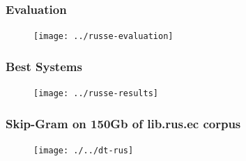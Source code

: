 \begin{frame}
\frametitle{ Evaluation }

\begin{figure}  
    \texttt{[image: ../russe-evaluation]}
\end{figure}

\end{frame}





\begin{frame}
\frametitle{ Best Systems }

\begin{figure}  
    \texttt{[image: ../russe-results]}
\end{figure}

\end{frame}


\begin{frame}
\frametitle{Skip-Gram on 150Gb of   lib.rus.ec corpus}
\begin{figure}
\centering
\texttt{[image: ./../dt-rus]}
\end{figure}
	
\end{frame}



%
%
%
%


